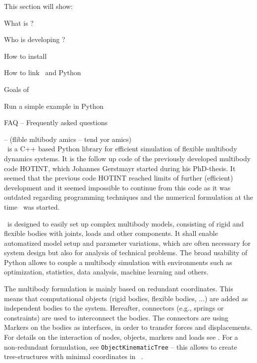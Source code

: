 This section will show:
\bn
  \item What is \codeName ?
  \item Who is developing \codeName ?
  \item How to install \codeName\ 
  \item How to link \codeName\ and Python
  \item Goals of \codeName
  \item Run a simple example in Python
  \item FAQ -- Frequently asked questions
\en

\codeName -- {\small (flible mltibody amics  -- tend yor amics)}\vspace{6pt}\\
\noindent \codeName\ is a C++ based Python library for efficient simulation of flexible multibody dynamics systems.
It is the follow up code of the previously developed multibody code HOTINT, which Johannes Gerstmayr started during his PhD-thesis.
It seemed that the previous code HOTINT reached limits of further (efficient) development and it seemed impossible to continue from this code as it was outdated regarding programming techniques and the numerical formulation at the time \codeName\ was started.

\codeName\ is designed to easily set up complex multibody models, consisting of rigid and flexible bodies with joints, loads and other components. It shall enable automatized model setup and parameter variations, which are often necessary for system design but also for analysis of technical problems. The broad usability of Python allows to couple a multibody simulation with environments such as optimization, statistics, data analysis, machine learning and others.

The multibody formulation is mainly based on redundant coordinates. This means that computational objects (rigid bodies, flexible bodies, ...) are added as independent bodies to the system. Hereafter, connectors (e.g., springs or constraints) are used to interconnect the bodies. The connectors are using Markers on the bodies as interfaces, in order to transfer forces and displacements.
For details on the interaction of nodes, objects, markers and loads see \refSection{sec:overview:items}. For a non-redundant formulation, see \texttt{ObjectKinematicTree} -- this allows to create tree-structures with minimal coordinates in \codeName\ .

